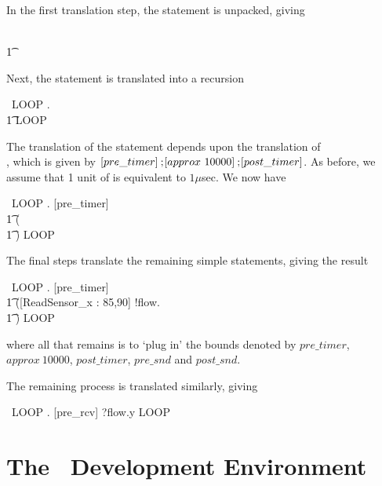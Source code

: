 In the first translation step, the  statement is unpacked, giving
\begin{zed}
\sbl {} \\
\t1  \sbr
\end{zed}

Next, the  statement is translated into a recursion
\begin{zed}
\rec\ LOOP . \sbl {} \\
\t1  \sbr \sq LOOP
\end{zed}

The translation of the  statement depends
upon the translation of \\ , which is 
given by $[pre\_timer] \mathbin{\mathrm{;}\!}
[approx\ 10000] \mathbin{\mathrm{;}\!} [post\_timer]$. As before, we assume that 
1 unit of  is equivalent to $1\mu$sec. We now have
\begin{zed}
\rec\ LOOP . [pre\_timer] \sq \\
\t1 (\sbl {} \sbr \\
\t1  \interrupt [approx\ 10000] ) \sq LOOP 
\end{zed}

The final steps translate the remaining simple statements, 
giving the result
\begin{zed}
\rec\ LOOP . [pre\_timer] \sq \\
\t1 ([ReadSensor_x : 85,90] 
\sq \kk!flow.\xx {} \sq \idle \\
\t1 \interrupt [approx\ 10000] ) \sq LOOP
\end{zed}
where all that remains is to `plug in' the bounds denoted by
$pre\_timer$, $approx\ 10000$, $post\_timer$, $pre\_snd$ and $post\_snd$.

The remaining process is translated similarly, giving
\begin{zed}
\rec\ LOOP . [pre\_rcv] \sq \kk?flow.y  \sq
  [AdjustValve_y : 200, 300] \sq LOOP
\end{zed}

\section{The \candle\ Development Environment\label{sec:prenv}}
